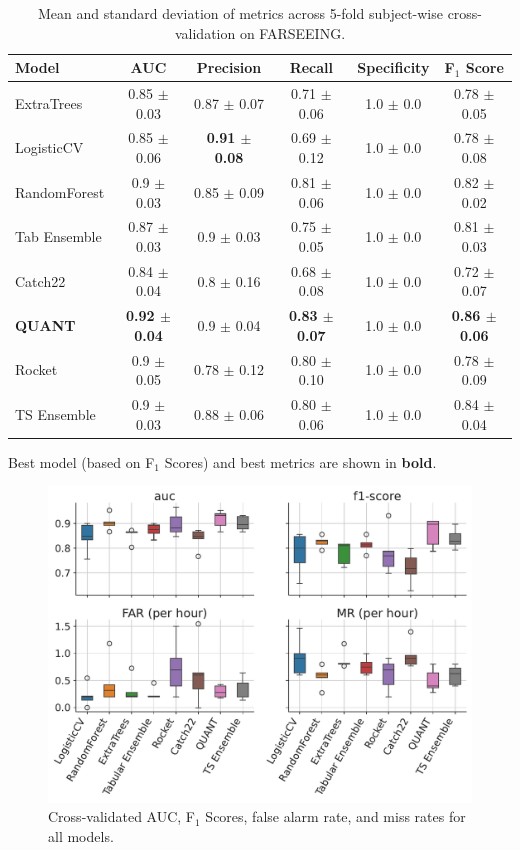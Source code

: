 \documentclass[runningheads]{llncs}
\begin{document}
\begin{table}[t]
\centering
\caption{Mean and standard deviation of metrics across 5-fold subject-wise cross-validation on FARSEEING.} \label{tab:cross-val-results}
\begin{tabularx}{0.96\textwidth}{l  @{\extracolsep{\fill}}  c  @{\extracolsep{\fill}}  c  @{\extracolsep{\fill}}  c  @{\extracolsep{\fill}}  c  @{\extracolsep{\fill}}  c}
\toprule
Model & AUC & Precision & Recall & Specificity & F$_1$ Score \\
\midrule
ExtraTrees & 0.85 $\pm$ 0.03 & 0.87 $\pm$ 0.07 & 0.71 $\pm$ 0.06 & 1.0 $\pm$ 0.0 & 0.78 $\pm$ 0.05 \\
LogisticCV & 0.85 $\pm$ 0.06 & \textbf{0.91 $\pm$ 0.08} & 0.69 $\pm$ 0.12 & 1.0 $\pm$ 0.0 & 0.78 $\pm$ 0.08 \\
RandomForest & 0.9 $\pm$ 0.03 & 0.85 $\pm$ 0.09 & 0.81 $\pm$ 0.06 & 1.0 $\pm$ 0.0 & 0.82 $\pm$ 0.02 \\
Tab Ensemble & 0.87 $\pm$ 0.03 & 0.9 $\pm$ 0.03 & 0.75 $\pm$ 0.05 & 1.0 $\pm$ 0.0 & 0.81 $\pm$ 0.03 \\
Catch22 & 0.84 $\pm$ 0.04 & 0.8 $\pm$ 0.16 & 0.68 $\pm$ 0.08 & 1.0 $\pm$ 0.0 & 0.72 $\pm$ 0.07 \\
\textbf{QUANT} & \textbf{0.92 $\pm$ 0.04} & 0.9 $\pm$ 0.04 & \textbf{0.83 $\pm$ 0.07} & 1.0 $\pm$ 0.0 & \textbf{0.86 $\pm$ 0.06} \\
Rocket & 0.9 $\pm$ 0.05 & 0.78 $\pm$ 0.12 & 0.80 $\pm$ 0.10 & 1.0 $\pm$ 0.0 & 0.78 $\pm$ 0.09 \\
TS Ensemble & 0.9 $\pm$ 0.03 & 0.88 $\pm$ 0.06 & 0.80 $\pm$ 0.06 & 1.0 $\pm$ 0.0 & 0.84 $\pm$ 0.04 \\
\bottomrule
\end{tabularx}
Best model (based on F$_1$ Scores) and best metrics are shown in \textbf{bold}.
\end{table}

\begin{figure}[h]
\includegraphics[width=\textwidth]{img/farseeing_metrics_boxplot.pdf}
\caption{Cross-validated AUC, F$_1$ Scores, false alarm rate, and miss rates for all models.} \label{fig:cross-val-boxplot}
\end{figure}
\end{document}
